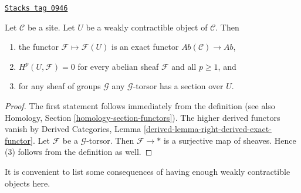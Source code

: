 \begin{lemma}[W contractible]
\label{sites-cohomology-lemma-w-contractible}
\href{https://stacks.math.columbia.edu/tag/0946}{\texttt{Stacks tag 0946}}

Let $\mathcal{C}$ be a site. Let $U$ be a weakly contractible
object of $\mathcal{C}$. Then
\begin{enumerate}
\item the functor $\mathcal{F} \mapsto \mathcal{F}(U)$ is an exact
functor $\textit{Ab}(\mathcal{C}) \to \textit{Ab}$,
\item $H^p(U, \mathcal{F}) = 0$
for every abelian sheaf $\mathcal{F}$ and all $p \geq 1$, and
\item for any sheaf of groups $\mathcal{G}$ any $\mathcal{G}$-torsor
has a section over $U$.
\end{enumerate}
\end{lemma}

\begin{proof}
The first statement follows immediately from the definition
(see also Homology, Section \ref{homology-section-functors}).
The higher derived functors vanish by
Derived Categories, Lemma \ref{derived-lemma-right-derived-exact-functor}.
Let $\mathcal{F}$ be a $\mathcal{G}$-torsor. Then $\mathcal{F} \to *$
is a surjective map of sheaves. Hence (3) follows from the
definition as well.
\end{proof}

It is convenient to list some consequences of having enough
weakly contractible objects here.

